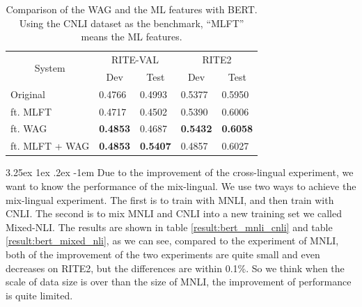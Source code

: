\documentclass[12pt]{article}
\makeatletter
\renewcommand\paragraph{\@startsection{paragraph}{5}{\z@}%
  {3.25ex \@plus1ex \@minus.2ex}%
  {-1em}%
  {\normalfont\normalsize\bfseries}}
\makeatother
\begin{document}
\begin{CJK*}{UTF8}{bkai}
\begin{spacing}{1.77}
\begin{table}[H]
  \centering
  \setlength{\extrarowheight}{-3pt}
  \caption{Comparison of the WAG and the ML features with BERT. Using the CNLI dataset as the benchmark, ``MLFT'' means the ML features.}
  \label{result:bert_csa_mlft_comparison}
  \begin{tabular}{|l|l|l|l|l|}
  \hline
  \multicolumn{1}{|c|}{\multirow{2}{*}{System}} & \multicolumn{2}{c|}{RITE-VAL} & \multicolumn{2}{c|}{RITE2} \\ \cline{2-5}
  \multicolumn{1}{|c|}{} & \multicolumn{1}{c|}{Dev} & \multicolumn{1}{c|}{Test} & \multicolumn{1}{c|}{Dev} & \multicolumn{1}{c|}{Test} \\ \hline
  Original & 0.4766 & 0.4993 & 0.5377 & 0.5950 \\ \hline
  ft.   MLFT & 0.4717 & 0.4502 & 0.5390 & 0.6006 \\ \hline
  ft.   WAG & \textbf{0.4853} & 0.4687 & \textbf{0.5432} & \textbf{0.6058} \\ \hline
  ft. MLFT   + WAG & \textbf{0.4853} & \textbf{0.5407} & 0.4857 & 0.6027 \\ \hline
  \end{tabular}
\end{table}

\paragraph{}
Due to the improvement of the cross-lingual experiment, we want to know the performance of the mix-lingual. We use two ways to achieve the mix-lingual experiment. The first is to train with MNLI, and then train with CNLI. The second is to mix MNLI and CNLI into a new training set we called Mixed-NLI. The results are shown in table \ref{result:bert_mnli_cnli} and table \ref{result:bert_mixed_nli}, as we can see, compared to the experiment of MNLI, both of the improvement of the two experiments are quite small and even decreases on RITE2, but the differences are within 0.1\%. So we think when the scale of data size is over than the size of MNLI, the improvement of performance is quite limited.


\end{spacing}
\end{CJK*}
\end{document}
